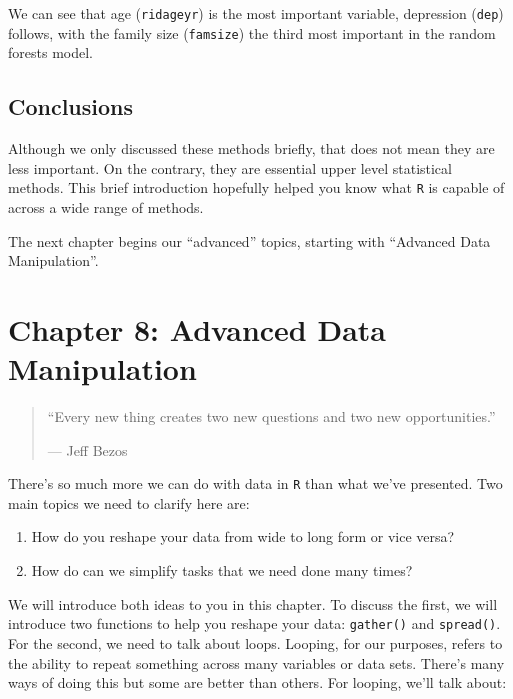 \documentclass[]{tufte-book}
\providecommand{\tightlist}{%
  \setlength{\itemsep}{0pt}\setlength{\parskip}{0pt}}
\theoremstyle{definition}
\theoremstyle{definition}
\theoremstyle{remark}
\begin{document}
We can see that age (\texttt{ridageyr}) is the most important variable,
depression (\texttt{dep}) follows, with the family size
(\texttt{famsize}) the third most important in the random forests model.

\section*{Conclusions}\label{conclusions-3}

Although we only discussed these methods briefly, that does not mean
they are less important. On the contrary, they are essential upper level
statistical methods. This brief introduction hopefully helped you know
what \texttt{R} is capable of across a wide range of methods.

The next chapter begins our ``advanced'' topics, starting with
``Advanced Data Manipulation''.

\chapter*{Chapter 8: Advanced Data
Manipulation}\label{chapter-8-advanced-data-manipulation}

\begin{quote}
``Every new thing creates two new questions and two new opportunities.''

--- Jeff Bezos
\end{quote}

There's so much more we can do with data in \texttt{R} than what we've
presented. Two main topics we need to clarify here are:

\begin{enumerate}
\def\labelenumi{\arabic{enumi}.}
\tightlist
\item
  How do you reshape your data from wide to long form or vice versa?
\item
  How do can we simplify tasks that we need done many times?
\end{enumerate}

We will introduce both ideas to you in this chapter. To discuss the
first, we will introduce two functions to help you reshape your data:
\texttt{gather()} and \texttt{spread()}. For the second, we need to talk
about loops. Looping, for our purposes, refers to the ability to repeat
something across many variables or data sets. There's many ways of doing
this but some are better than others. For looping, we'll talk about:
\end{document}
